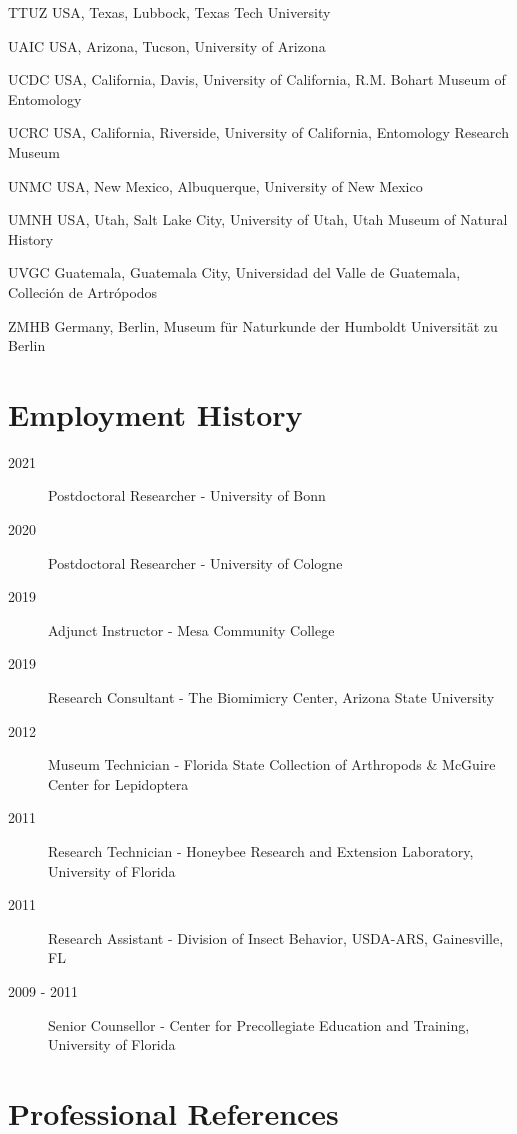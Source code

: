 \documentclass[12pt,a4paper]{article}
\begin{document}
\begin{collections}
			\item [TTUZ] USA, Texas, Lubbock, Texas Tech University
			\item [UAIC] USA, Arizona, Tucson, University of Arizona
			\item [UCDC] USA, California, Davis, University of California, R.M. Bohart Museum of Entomology
			\item [UCRC] USA, California, Riverside, University of California, Entomology Research Museum
			\item [UNMC] USA, New Mexico, Albuquerque, University of New Mexico
			\item [UMNH] USA, Utah, Salt Lake City, University of Utah, Utah Museum of Natural History
			\item [UVGC] Guatemala, Guatemala City, Universidad del Valle de Guatemala, Colleci\'{o}n de Artr\'{o}podos
			\item [ZMHB] Germany, Berlin, Museum f\"{u}r Naturkunde der Humboldt Universit\"{a}t zu Berlin
		\end{collections}

\section*{Employment History}
	\begin{description}
		\item [2021] Postdoctoral Researcher - University of Bonn
		\item [2020] Postdoctoral Researcher - University of Cologne
		\item [2019] Adjunct Instructor - Mesa Community College
		\item [2019] Research Consultant - The Biomimicry Center, Arizona State University
		\item [2012] Museum Technician - Florida State Collection of Arthropods \& McGuire Center for Lepidoptera
		\item [2011] Research Technician - Honeybee Research and Extension Laboratory, University of Florida
		\item [2011] Research Assistant - Division of Insect Behavior, USDA-ARS, Gainesville, FL
		\item [2009 - 2011] Senior Counsellor - Center for Precollegiate Education and Training, University of Florida
	\end{description}

\section*{Professional References}
\end{document}
